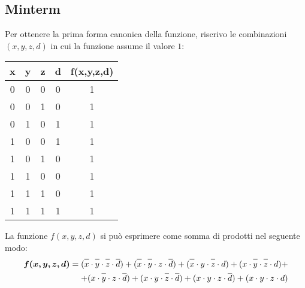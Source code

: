 \documentclass{article}
\newcommand*{\oline}[1]{\overline{#1\mathstrut}}
\begin{document}
\subsection*{Minterm}
Per ottenere la prima forma canonica della funzione, riscrivo le combinazioni $(x,y,z,d)$ in cui la funzione assume il valore $1$:\\
\begin{center}
	\begin{tabular}{|c|c|c|c|c|}
		\hline
		\textbf{x} & \textbf{y} & \textbf{z} & \textbf{d} & \textbf{f(x,y,z,d)} \\
		\hline
		0 & 0 & 0 & 0 & 1 \\
		\hline
		0 & 0 & 1 & 0 & 1 \\
		\hline
		0 & 1 & 0 & 1 & 1 \\
		\hline
		1 & 0 & 0 & 1 & 1 \\
		\hline
		1 & 0 & 1 & 0 & 1 \\
		\hline
		1 & 1 & 0 & 0 & 1 \\
		\hline
		1 & 1 & 1 & 0 & 1 \\
		\hline
		1 & 1 & 1 & 1 & 1 \\
		\hline
	\end{tabular}
\end{center}
La funzione $f(x,y,z,d)$ si può esprimere come somma di prodotti nel seguente modo:
\begin{align*}
\bm{f(x,y,z,d)} = (\oline{x} \cdot \oline{y} \cdot \oline{z} \cdot \oline{d}) + (\oline{x} \cdot \oline{y}\cdot z \cdot \oline{d})
+ (\oline{x} \cdot y \cdot \oline{z} \cdot d) + (x \cdot \oline{y} \cdot \oline{z} \cdot d) + \\
+ (x \cdot \oline{y} \cdot z \cdot \oline{d}) + (x \cdot y \cdot \oline{z} \cdot \oline{d}) + (x \cdot y \cdot z \cdot \oline{d}) + 
(x \cdot y \cdot z \cdot d)
\end{align*}
\end{document}
